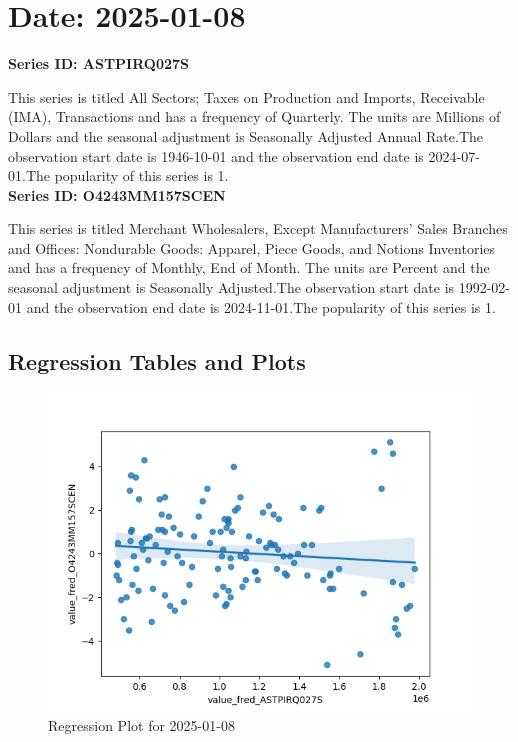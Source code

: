 \section{Date: 2025-01-08}
\noindent \textbf{Series ID: ASTPIRQ027S} 

\noindent This series is titled All Sectors; Taxes on Production and Imports, Receivable (IMA), Transactions and has a frequency of Quarterly. The units are Millions of Dollars and the seasonal adjustment is Seasonally Adjusted Annual Rate.The observation start date is 1946-10-01 and the observation end date is 2024-07-01.The popularity of this series is 1. \\ 

\noindent \textbf{Series ID: O4243MM157SCEN} 

\noindent This series is titled Merchant Wholesalers, Except Manufacturers' Sales Branches and Offices: Nondurable Goods: Apparel, Piece Goods, and Notions Inventories and has a frequency of Monthly, End of Month. The units are Percent and the seasonal adjustment is Seasonally Adjusted.The observation start date is 1992-02-01 and the observation end date is 2024-11-01.The popularity of this series is 1. \\ 

\subsection{Regression Tables and Plots}


\begin{figure}
\centering
\includegraphics[scale = 0.9]{plots/plot_2025-01-08.png}
\caption{Regression Plot for 2025-01-08}
\end{figure}
\newpage
